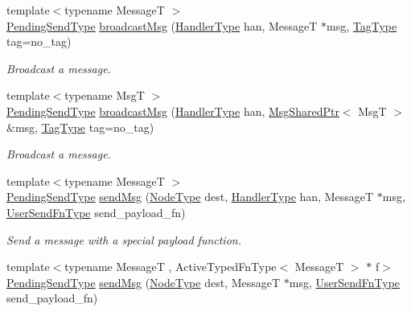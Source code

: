 \begin{DoxyCompactItemize}
{\footnotesize template$<$typename MessageT $>$ }\\\hyperlink{structvt_1_1messaging_1_1_active_messenger_a3626a6ca76d8ad4ec7c3b47a2c70d3a8}{Pending\+Send\+Type} \hyperlink{group__sendpayload_ga90a75f1f1bbff156dca7a2237eec1800}{broadcast\+Msg} (\hyperlink{namespacevt_af64846b57dfcaf104da3ef6967917573}{Handler\+Type} han, MessageT $\ast$msg, \hyperlink{namespacevt_a84ab281dae04a52a4b243d6bf62d0e52}{Tag\+Type} tag=no\+\_\+tag)
\begin{DoxyCompactList}\small\item\em Broadcast a message. \end{DoxyCompactList}\item 
{\footnotesize template$<$typename MsgT $>$ }\\\hyperlink{structvt_1_1messaging_1_1_active_messenger_a3626a6ca76d8ad4ec7c3b47a2c70d3a8}{Pending\+Send\+Type} \hyperlink{group__sendpayload_ga115fefe8db464acf9c2da0fe6469cb86}{broadcast\+Msg} (\hyperlink{namespacevt_af64846b57dfcaf104da3ef6967917573}{Handler\+Type} han, \hyperlink{structvt_1_1messaging_1_1_msg_shared_ptr}{Msg\+Shared\+Ptr}$<$ MsgT $>$ \&msg, \hyperlink{namespacevt_a84ab281dae04a52a4b243d6bf62d0e52}{Tag\+Type} tag=no\+\_\+tag)
\begin{DoxyCompactList}\small\item\em Broadcast a message. \end{DoxyCompactList}\item 
{\footnotesize template$<$typename MessageT $>$ }\\\hyperlink{structvt_1_1messaging_1_1_active_messenger_a3626a6ca76d8ad4ec7c3b47a2c70d3a8}{Pending\+Send\+Type} \hyperlink{group__sendpayload_ga946e8ef3e8e2430b70ff09dd555bc837}{send\+Msg} (\hyperlink{namespacevt_a866da9d0efc19c0a1ce79e9e492f47e2}{Node\+Type} dest, \hyperlink{namespacevt_af64846b57dfcaf104da3ef6967917573}{Handler\+Type} han, MessageT $\ast$msg, \hyperlink{structvt_1_1messaging_1_1_active_messenger_a4b1993ad77436b6ed6c7fd32801c50ed}{User\+Send\+Fn\+Type} send\+\_\+payload\+\_\+fn)
\begin{DoxyCompactList}\small\item\em Send a message with a special payload function. \end{DoxyCompactList}\item 
{\footnotesize template$<$typename MessageT , Active\+Typed\+Fn\+Type$<$ Message\+T $>$ $\ast$ f$>$ }\\\hyperlink{structvt_1_1messaging_1_1_active_messenger_a3626a6ca76d8ad4ec7c3b47a2c70d3a8}{Pending\+Send\+Type} \hyperlink{group__sendpayload_ga3685dbcba2c7fcd75fdfd10b613684ad}{send\+Msg} (\hyperlink{namespacevt_a866da9d0efc19c0a1ce79e9e492f47e2}{Node\+Type} dest, MessageT $\ast$msg, \hyperlink{structvt_1_1messaging_1_1_active_messenger_a4b1993ad77436b6ed6c7fd32801c50ed}{User\+Send\+Fn\+Type} send\+\_\+payload\+\_\+fn)

\end{DoxyCompactItemize}
